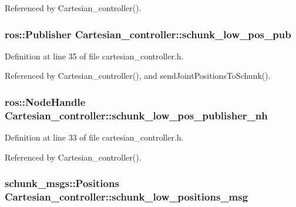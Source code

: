 Referenced by Cartesian\-\_\-controller().

\hypertarget{classCartesian__controller_af06313084ef058d1f979fddeb33d5100}{
\subsubsection[{schunk\-\_\-low\-\_\-pos\-\_\-pub}]{\setlength{\rightskip}{0pt plus 5cm}ros\-::\-Publisher Cartesian\-\_\-controller\-::schunk\-\_\-low\-\_\-pos\-\_\-pub\hspace{0.3cm}{\ttfamily [protected]}}}\label{classCartesian__controller_af06313084ef058d1f979fddeb33d5100}


Definition at line 35 of file cartesian\-\_\-controller.\-h.



Referenced by Cartesian\-\_\-controller(), and send\-Joint\-Positions\-To\-Schunk().

\hypertarget{classCartesian__controller_aabe48e7ab08b0235d4cd94213b8faf5d}{
\subsubsection[{schunk\-\_\-low\-\_\-pos\-\_\-publisher\-\_\-nh}]{\setlength{\rightskip}{0pt plus 5cm}ros\-::\-Node\-Handle Cartesian\-\_\-controller\-::schunk\-\_\-low\-\_\-pos\-\_\-publisher\-\_\-nh\hspace{0.3cm}{\ttfamily [protected]}}}\label{classCartesian__controller_aabe48e7ab08b0235d4cd94213b8faf5d}


Definition at line 33 of file cartesian\-\_\-controller.\-h.



Referenced by Cartesian\-\_\-controller().

\hypertarget{classCartesian__controller_a2dd700542bd6243eef10d34811055584}{
\subsubsection[{schunk\-\_\-low\-\_\-positions\-\_\-msg}]{\setlength{\rightskip}{0pt plus 5cm}schunk\-\_\-msgs\-::\-Positions Cartesian\-\_\-controller\-::schunk\-\_\-low\-\_\-positions\-\_\-msg\hspace{0.3cm}{\ttfamily [protected]}}}\label{classCartesian__controller_a2dd700542bd6243eef10d34811055584}



